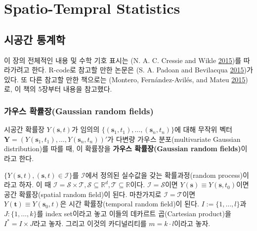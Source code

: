 \documentclass[b5paper,]{book}
\theoremstyle{definition}
\theoremstyle{definition}
\theoremstyle{definition}
\theoremstyle{remark}
\let\BeginKnitrBlock\begin \let\EndKnitrBlock\end
\begin{document}
\part{Spatio-Tempral
Statistics}\label{part-spatio-tempral-statistics}

\chapter{시공간 통계학}\label{spatiotemporal}

이 장의 전체적인 내용 및 수학 기호 표시는 (N. A. C. Cressie and Wikle
\protect\hyperlink{ref-Cressie2015}{2015})를 따라가려고 한다. R-code로
참고할 만한 논문은 (S. A. Padoan and Bevilacqua
\protect\hyperlink{ref-Padoan2015}{2015})가 있다. 또 다른 참고할 만한
책으로는 (Montero, Fernández-Avilés, and Mateu
\protect\hyperlink{ref-Montero2015}{2015})로, 이 책의 5장부터 내용을
참고했다.

\section{가우스 확률장(Gaussian random
fields)}\label{-gaussian-random-fields}

\BeginKnitrBlock{definition}[가우스 확률장]
\protect\hypertarget{def:unnamed-chunk-194}{}{\label{def:unnamed-chunk-194}
{} }시공간 확률장 \(Y(\mathbf{s},t)\)가
임의의 \(\{(\mathbf{s}_{1},t_{1}),\ldots , (\mathbf{s}_{n},t_{n})\}\)에
대해 무작위 벡터
\(\mathbf{Y}=(Y(\mathbf{s}_{1},t_{1}),\ldots , Y(\mathbf{s}_{n},t_{n}) )'\)가
다변량 가우스 분포(multivariate Gaussian distribution)를 따를 때, 이
확률장을 \textbf{가우스 확률장(Gaussian random fields)}이라고 한다.
\EndKnitrBlock{definition}

\(\{ Y(\mathbf{s},t), (\mathbf{s},t) \in \mathcal{I}\}\)를
\(\mathcal{I}\)에서 정의된 실수값을 갖는 확률과정(random process)이라고
하자. 이 때
\(\mathcal{I}=\mathcal{S}\times\mathcal{T}, \mathcal{S}\subseteq \mathbb{R}^{d}, \mathcal{T}\subseteq \mathbb{R}\)이다.
\(\mathcal{I}=\mathcal{S}\)이면
\(Y(\mathbf{s})\equiv Y(\mathbf{s},t_{0})\)이면 공간 확률장(spatial
random field)이 된다. 마찬가지로 \(\mathcal{I}=\mathcal{T}\)이면
\(Y(\mathbf{t})\equiv Y(\mathbf{s}_{0},t)\)은 시간 확률장(temporal
random field)이 된다. \(I:=\{1,\ldots , l\}\)과
\(J:\{ 1, \ldots, k \}\)를 index set이라고 놓고 이들의 데카르트
곱(Cartesian product)을 \(I^{*}=I\times J\)라고 놓자. 그리고 이것의
카디널리티를 \(m=k\cdot l\)이라고 놓자.
\end{document}
